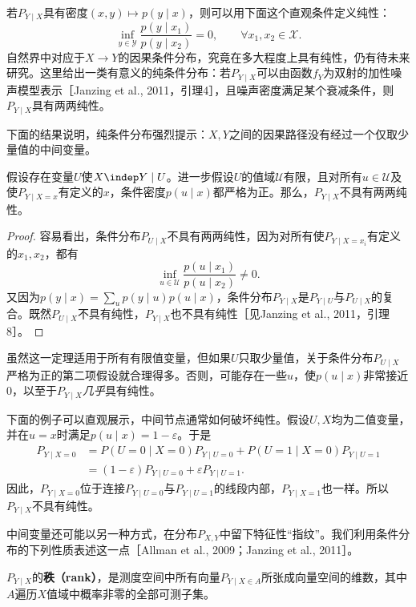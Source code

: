 若$P_{Y\mid X}$具有密度$(x,y)\mapsto p(y\mid x)$，则可以用下面这个直观条件定义纯性：
\[
 \inf_{y\in\mathcal Y}\frac{p(y\mid x_1)}{p(y\mid x_2)}=0,
 \qquad\forall x_1,x_2\in\mathcal X.
\]
自然界中对应于$X\to Y$的因果条件分布，究竟在多大程度上具有纯性，仍有待未来研究。这里给出一类有意义的纯条件分布：若$P_{Y\mid X}$可以由函数$f_Y$为双射的加性噪声模型表示［Janzing et al., 2011，引理4］，且噪声密度满足某个衰减条件，则$P_{Y\mid X}$具有两两纯性。

下面的结果说明，纯条件分布强烈提示：$X,Y$之间的因果路径没有经过一个仅取少量值的中间变量。
\begin{theorem}[严格正的条件分布与非纯性]
假设存在变量$U$使$X\indep Y\mid U$。进一步假设$U$的值域$\mathcal U$有限，且对所有$u\in\mathcal U$及使$P_{Y\mid X=x}$有定义的$x$，条件密度$p(u\mid x)$都严格为正。那么，$P_{Y\mid X}$不具有两两纯性。
\end{theorem}
\begin{proof}
容易看出，条件分布$P_{U\mid X}$不具有两两纯性，因为对所有使$P_{Y\mid X=x_i}$有定义的$x_1,x_2$，都有
\[
 \inf_{u\in\mathcal U}\frac{p(u\mid x_1)}{p(u\mid x_2)}\ne0.
\]
又因为$p(y\mid x)=\sum_u p(y\mid u)p(u\mid x)$，条件分布$P_{Y\mid X}$是$P_{Y\mid U}$与$P_{U\mid X}$的复合。既然$P_{U\mid X}$不具有纯性，$P_{Y\mid X}$也不具有纯性［见Janzing et al., 2011，引理8］。
\end{proof}

虽然这一定理适用于所有有限值变量，但如果$U$只取少量值，关于条件分布$P_{U\mid X}$严格为正的第二项假设就合理得多。否则，可能存在一些$u$，使$p(u\mid x)$非常接近$0$，以至于$P_{Y\mid X}$\emph{几乎}具有纯性。

下面的例子可以直观展示，中间节点通常如何破坏纯性。假设$U,X$均为二值变量，并在$u=x$时满足$p(u\mid x)=1-\varepsilon$。于是
\[
\begin{aligned}
 P_{Y\mid X=0}
 &=P(U=0\mid X=0)P_{Y\mid U=0}
  +P(U=1\mid X=0)P_{Y\mid U=1}\\
 &=(1-\varepsilon)P_{Y\mid U=0}+\varepsilon P_{Y\mid U=1}.
\end{aligned}
\]
因此，$P_{Y\mid X=0}$位于连接$P_{Y\mid U=0}$与$P_{Y\mid U=1}$的线段内部，$P_{Y\mid X=1}$也一样。所以$P_{Y\mid X}$不具有纯性。

中间变量还可能以另一种方式，在分布$P_{X,Y}$中留下特征性“指纹”。我们利用条件分布的下列性质表述这一点［Allman et al., 2009；Janzing et al., 2011］。
\begin{definition}[条件分布的秩]
$P_{Y\mid X}$的\textbf{秩（rank）}，是测度空间中所有向量$P_{Y\mid X\in A}$所张成向量空间的维数，其中$A$遍历$X$值域中概率非零的全部可测子集。
\end{definition}

